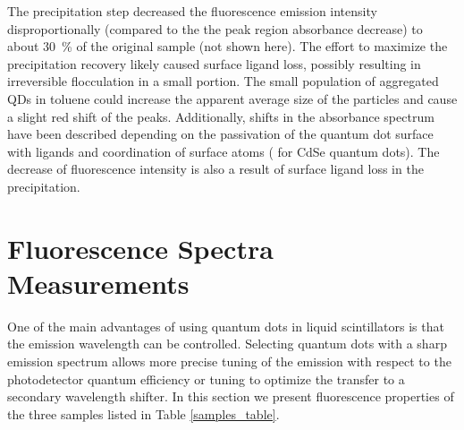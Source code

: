 \documentclass[cits]{JINST}
\begin{document}
The precipitation step decreased the fluorescence emission intensity disproportionally (compared to the the peak region absorbance decrease) to about 30~\% of the original sample (not shown here). The effort to maximize the precipitation recovery likely caused surface ligand loss, possibly resulting in irreversible flocculation in a small portion. The small population of aggregated QDs in toluene could increase the apparent average size of the particles and cause a slight red shift of the peaks. Additionally, shifts in the absorbance spectrum have been described depending on the passivation of the quantum dot surface with ligands and coordination of surface atoms (\cite{inerbaev} for CdSe quantum dots). The decrease of fluorescence intensity is also a result of surface ligand loss in the precipitation. 

\section{Fluorescence Spectra Measurements}\label{Fluorescence_section}
One of the main advantages of using quantum dots in liquid scintillators is that the emission wavelength can be controlled. Selecting quantum dots with a sharp emission spectrum allows more precise tuning of the emission with respect to the photodetector quantum efficiency or tuning to optimize the transfer to a secondary wavelength shifter. In this section we present fluorescence properties of the three samples listed in Table \ref{samples_table}. 

\end{document}
